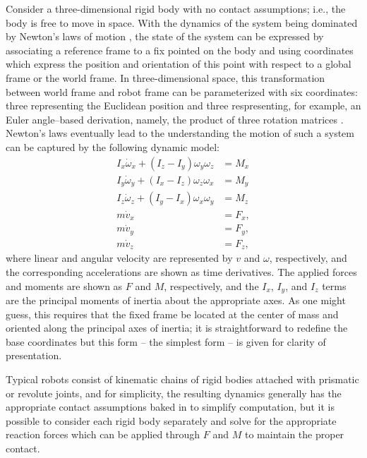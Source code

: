 Consider a three-dimensional rigid body with no contact assumptions; i.e., the body is free to move in space.
%
With the dynamics of the system being dominated by Newton's laws of motion \cite{feynman1963}, the state of the system can be expressed by associating a reference frame to a fix pointed on the body and using coordinates which express the position and orientation of this point with respect to a global frame or the world frame.
%
In three-dimensional space, this transformation between world frame and robot frame can be parameterized with six coordinates: three representing the Euclidean position and three respresenting, for example, an Euler angle--based derivation, namely, the product of three rotation matrices \cite{Baruh98}.
%
Newton's laws eventually lead to the understanding the motion of such a system can be captured by the following dynamic model:
\begin{align}
  \nonumber
  I_{x} \dot{\omega}_{x} + (I_{z} - I_{y}) \omega_{y} \omega_{z} &= M_{x}\\
  \nonumber
  I_{y} \dot{\omega}_{y} + (I_{x} - I_{z}) \omega_{z} \omega_{x} &= M_{y}\\
  \nonumber
  I_{z} \dot{\omega}_{z} + (I_{y} - I_{x}) \omega_{x} \omega_{y} &= M_{z}\\
  \nonumber
  m \dot{v}_{x} &= F_{x},\\
  \nonumber
  m \dot{v}_{y} &= F_{y},\\
  m \dot{v}_{z} &= F_{z},
\end{align}
where linear and angular velocity are represented by $v$ and $\omega$, respectively, and the corresponding accelerations are shown as time derivatives.
%
The applied forces and moments are shown as $F$ and $M$, respectively, and the $I_{x}$, $I_{y}$, and $I_{z}$ terms are the principal moments of inertia about the appropriate axes.
%
As one might guess, this requires that the fixed frame be located at the center of mass and oriented along the principal axes of inertia; it is straightforward to redefine the base coordinates but this form -- the simplest form -- is given for clarity of presentation.

Typical robots consist of kinematic chains of rigid bodies attached with prismatic or revolute joints, and for simplicity, the resulting dynamics generally has the appropriate contact assumptions baked in to simplify computation, but it is possible to consider each rigid body separately and solve for the appropriate reaction forces which can be applied through $F$ and $M$ to maintain the proper contact.


